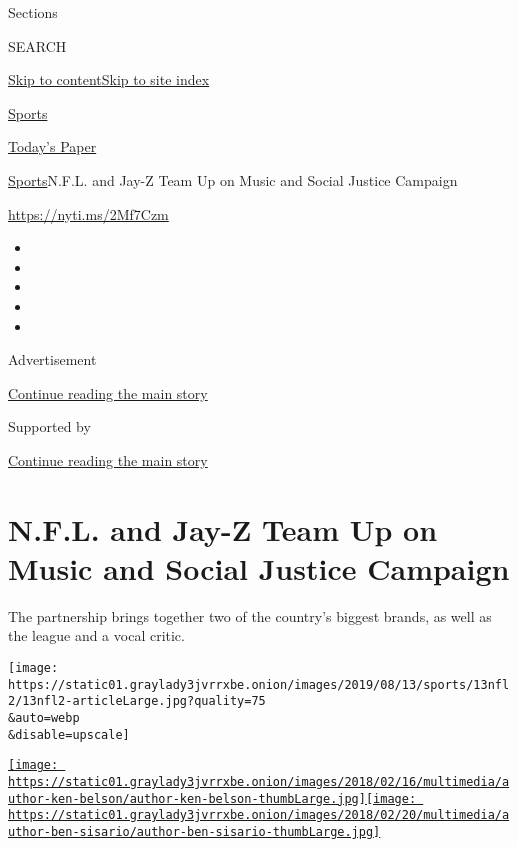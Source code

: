Sections

SEARCH

\protect\hyperlink{site-content}{Skip to
content}\protect\hyperlink{site-index}{Skip to site index}

\href{https://www.nytimes3xbfgragh.onion/section/sports}{Sports}

\href{https://myaccount.nytimes3xbfgragh.onion/auth/login?response_type=cookie\&client_id=vi}{}

\href{https://www.nytimes3xbfgragh.onion/section/todayspaper}{Today's
Paper}

\href{/section/sports}{Sports}\textbar{}N.F.L. and Jay-Z Team Up on
Music and Social Justice Campaign

\url{https://nyti.ms/2Mf7Czm}

\begin{itemize}
\item
\item
\item
\item
\item
\end{itemize}

Advertisement

\protect\hyperlink{after-top}{Continue reading the main story}

Supported by

\protect\hyperlink{after-sponsor}{Continue reading the main story}

\hypertarget{nfl-and-jay-z-team-up-on-music-and-social-justice-campaign}{%
\section{N.F.L. and Jay-Z Team Up on Music and Social Justice
Campaign}\label{nfl-and-jay-z-team-up-on-music-and-social-justice-campaign}}

The partnership brings together two of the country's biggest brands, as
well as the league and a vocal critic.

\texttt{[image: https://static01.graylady3jvrrxbe.onion/images/2019/08/13/sports/13nfl2/13nfl2-articleLarge.jpg?quality=75\\\&auto=webp\\\&disable=upscale]}

\href{https://www.nytimes3xbfgragh.onion/by/ken-belson}{\texttt{[image: https://static01.graylady3jvrrxbe.onion/images/2018/02/16/multimedia/author-ken-belson/author-ken-belson-thumbLarge.jpg]}}\href{https://www.nytimes3xbfgragh.onion/by/ben-sisario}{\texttt{[image: https://static01.graylady3jvrrxbe.onion/images/2018/02/20/multimedia/author-ben-sisario/author-ben-sisario-thumbLarge.jpg]}}

